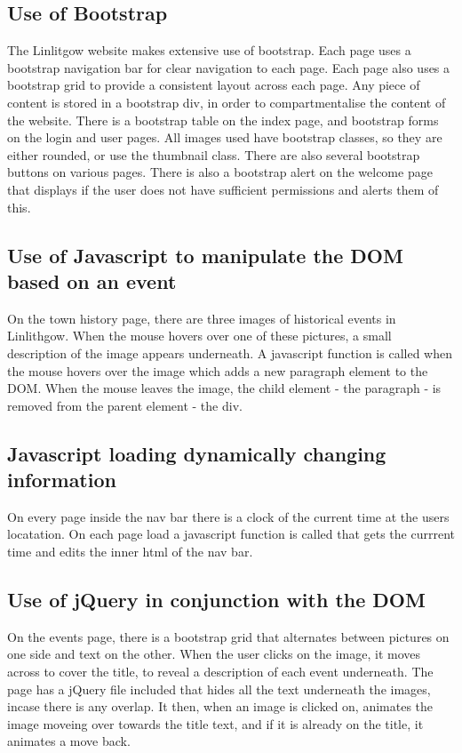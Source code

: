 \documentclass[12pt,a4paper]{article}
\begin{document}
		\subsection{Use of Bootstrap}
		The Linlitgow website makes extensive use of bootstrap. Each page uses a bootstrap navigation bar for clear navigation to each page. Each page also uses a bootstrap grid to provide a consistent layout across each page. Any piece of content is stored in a bootstrap div, in order to compartmentalise the content of the website. There is a bootstrap table on the index page, and bootstrap forms on the login and user pages. All images used have bootstrap classes, so they are either rounded, or use the thumbnail class. There are also several bootstrap buttons on various pages. There is also a bootstrap alert on the welcome page that displays if the user does not have sufficient permissions and alerts them of this.

		\subsection{Use of Javascript to manipulate the DOM based on an event}
		On the town history page, there are three images of historical events in Linlithgow. When the mouse hovers over one of these pictures, a small description of the image appears underneath. A javascript function is called when the mouse hovers over the image which adds a new paragraph element to the DOM. When the mouse leaves the image, the child element - the paragraph - is removed from the parent element - the div.

		\subsection{Javascript loading dynamically changing information}
		On every page inside the nav bar there is a clock of the current time at the users locatation. On each page load a javascript function is called that gets the currrent time and edits the inner html of the nav bar.

		\subsection{Use of jQuery in conjunction with the DOM}
		On the events page, there is a bootstrap grid that alternates between pictures on one side and text on the other. When the user clicks on the image, it moves across to cover the title, to reveal a description of each event underneath. The page has a jQuery file included that hides all the text underneath the images, incase there is any overlap. It then, when an image is clicked on, animates the image moveing over towards the title text, and if it is already on the title, it animates a move back.
\end{document}
